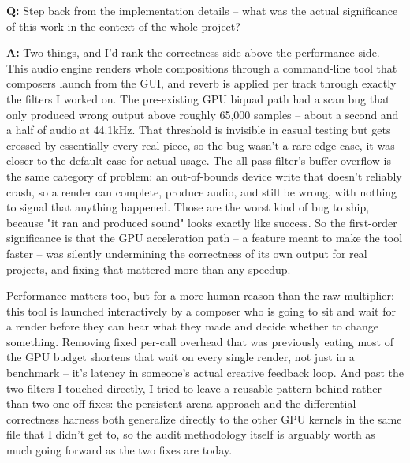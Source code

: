 \documentclass[11pt]{article}
\newcommand{\Q}[1]{\vspace{0.6em}\noindent\textbf{\textcolor{blue!60!black}{Q:}} #1\par}
\newcommand{\A}[1]{\noindent\textbf{A:} #1\par}
\begin{document}
\Q{Step back from the implementation details -- what was the actual significance of this work in the context of the whole project?}
\A{Two things, and I'd rank the correctness side above the performance side. This audio engine renders whole compositions through a command-line tool that composers launch from the GUI, and reverb is applied per track through exactly the filters I worked on. The pre-existing GPU biquad path had a scan bug that only produced wrong output above roughly 65{,}000 samples -- about a second and a half of audio at 44.1kHz. That threshold is invisible in casual testing but gets crossed by essentially every real piece, so the bug wasn't a rare edge case, it was closer to the default case for actual usage. The all-pass filter's buffer overflow is the same category of problem: an out-of-bounds device write that doesn't reliably crash, so a render can complete, produce audio, and still be wrong, with nothing to signal that anything happened. Those are the worst kind of bug to ship, because "it ran and produced sound" looks exactly like success. So the first-order significance is that the GPU acceleration path -- a feature meant to make the tool faster -- was silently undermining the correctness of its own output for real projects, and fixing that mattered more than any speedup.

Performance matters too, but for a more human reason than the raw multiplier: this tool is launched interactively by a composer who is going to sit and wait for a render before they can hear what they made and decide whether to change something. Removing fixed per-call overhead that was previously eating most of the GPU budget shortens that wait on every single render, not just in a benchmark -- it's latency in someone's actual creative feedback loop. And past the two filters I touched directly, I tried to leave a reusable pattern behind rather than two one-off fixes: the persistent-arena approach and the differential correctness harness both generalize directly to the other GPU kernels in the same file that I didn't get to, so the audit methodology itself is arguably worth as much going forward as the two fixes are today.}
\end{document}
